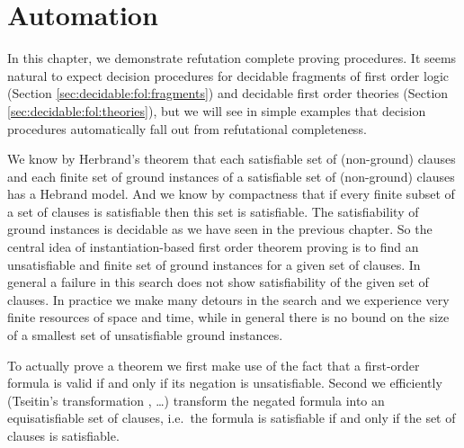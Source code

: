 
\chapter{Automation}



In this chapter, we demonstrate refutation complete proving procedures.
It seems natural to expect decision procedures 
for decidable fragments of first order logic 
(Section \ref{sec:decidable:fol:fragments})
and decidable first order theories (Section \ref{sec:decidable:fol:theories}),
but we will see in simple examples that decision procedures automatically fall out 
from refutational completeness.


%
We know by Herbrand's theorem 
that each satisfiable set of (non-ground) clauses
and each finite set of ground instances of a satisfiable set of (non-ground) clauses
has a Hebrand model. 
And we know by compactness 
that if every finite subset of a set of clauses is satisfiable then this set is satisfiable.
The satisfiability of ground instances is decidable as we have seen in the previous chapter.
So the central idea of instantiation-based first order theorem proving 
is to find an unsatisfiable and finite set of ground instances for a given set of clauses.
In general a failure in this search does not show satisfiability of the given set of clauses.
In practice we make many detours in the search and we experience very finite resources of space and time, 
while in general there is no bound on the size of a smallest set of unsatisfiable ground instances.



To actually prove a theorem 
we first make use of the fact that a first-order formula is valid if and only if its negation is unsatisfiable.
Second we efficiently (Tseitin's transformation \cite{tseitin70}, \ldots) transform the negated formula into an {\myem equisatisfiable} set of clauses,
i.e.~the formula is satisfiable if and only if the set of clauses is satisfiable.


